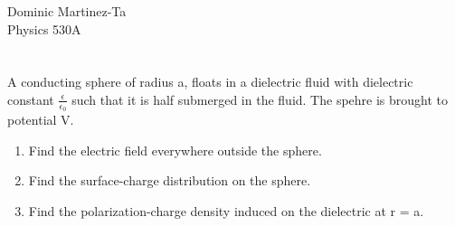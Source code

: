 \documentclass{article}
\begin{document}
Dominic Martinez-Ta\\
Physics 530A
\section{}
A conducting sphere of radius a, floats in a dielectric fluid with dielectric constant $\frac{\epsilon}{\epsilon_0}$ such that it is half submerged in the fluid. The spehre is brought to potential V.
\begin{enumerate}
\item Find the electric field everywhere outside the sphere.
\item Find the surface-charge distribution on the sphere.
\item Find the polarization-charge density induced on the dielectric at r = a.
\end{enumerate}
\end{document}
